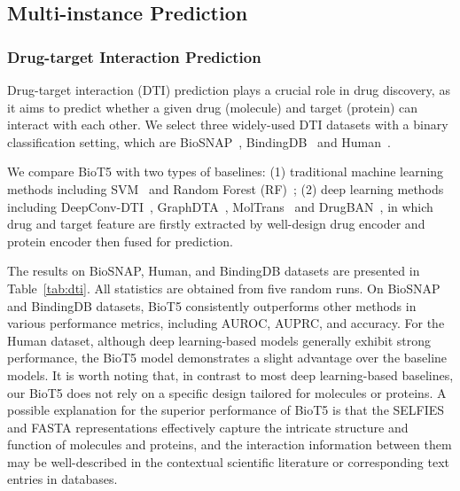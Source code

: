 \documentclass[11pt]{article}
\newcommand{\method}{{BioT5}}
\begin{document}
\subsection{Multi-instance Prediction}
\label{sec:multi_instance}
\subsubsection{Drug-target Interaction Prediction}
\label{sec:dti}
Drug-target interaction (DTI) prediction plays a crucial role in drug discovery, as it aims to predict whether a given drug (molecule) and target (protein) can interact with each other.
We select three widely-used DTI datasets with a binary classification setting, which are BioSNAP~\citep{zitnik2018biosnap}, BindingDB~\citep{liu2007bindingdb} and Human~\citep{liu2015improving,chen2020transformercpi}.

We compare \method{} with two types of baselines:
(1) traditional machine learning methods including SVM~\citep{cortes1995support} and Random Forest (RF)~\citep{ho1995random};
(2) deep learning methods including DeepConv-DTI~\citep{Lee2019DeepConvDTIPO}, GraphDTA~\citep{Nguyen2020GraphDTAPD}, MolTrans~\citep{Huang2021MolTransMI} and DrugBAN~\citep{bai2023interpretable}, in which drug and target feature are firstly extracted by well-design drug encoder and protein encoder then fused for prediction.

The results on BioSNAP, Human, and BindingDB datasets are presented in Table~\ref{tab:dti}. All statistics are obtained from five random runs.
On BioSNAP and BindingDB datasets, \method{} consistently outperforms other methods in various performance metrics, including AUROC, AUPRC, and accuracy.
For the Human dataset, although deep learning-based models generally exhibit strong performance, the \method{} model demonstrates a slight advantage over the baseline models.
It is worth noting that, in contrast to most deep learning-based baselines, our \method{} does not rely on a specific design tailored for molecules or proteins. A possible explanation for the superior performance of \method{} is that the SELFIES and FASTA representations effectively capture the intricate structure and function of molecules and proteins, and the interaction information between them may be well-described in the contextual scientific literature or corresponding text entries in databases.
\end{document}
